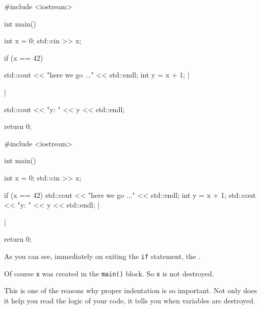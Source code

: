\begin{consolethree}[escapeinside=||]
#include <iostream>

int main()
{    
     int x = 0;
     std::cin >> x;
     
     if (x == 42)
     {   
         std::cout << "here we go ..." << std::endl;
         int y = x + 1;
         ||
     }
     std::cout << "y: " << y << std::endl;

     return 0;
}
\end{consolethree}



\begin{consolethree}[escapeinside=||]
#include <iostream>

int main()
{    
     int x = 0;
     std::cin >> x;

     if (x == 42)
     {   
         std::cout << "here we go ..." <<
         std::endl;
         int y = x + 1;
         std::cout << "y: " << y << std::endl;
     }
     ||
             
     return 0;
}
\end{consolethree}
As you can see, immediately on exiting the \texttt{if} statement, the .

Of course \texttt{x} was created in the \texttt{main()} block. So \texttt{x} is not destroyed.

This is one of the reasons why proper indentation is so important. Not only does it help you read the logic of your code, it tells you when variables are destroyed.

\newpage{}

